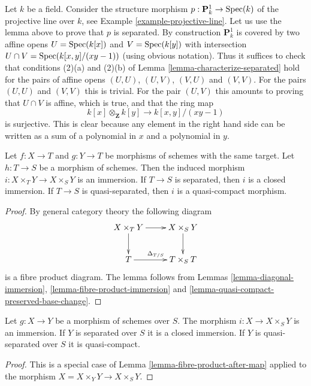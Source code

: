 \begin{example}
\label{example-projective-line-separated}
Let $k$ be a field. Consider the structure morphism
$p : \mathbf{P}^1_k \to \mathop{\mathrm{Spec}}(k)$ of the projective
line over $k$, see Example \ref{example-projective-line}.
Let us use the lemma above to prove that $p$
is separated. By construction $\mathbf{P}^1_k$ is covered by two
affine opens $U = \mathop{\mathrm{Spec}}(k[x])$ and $V = \mathop{\mathrm{Spec}}(k[y])$
with intersection $U \cap V = \mathop{\mathrm{Spec}}(k[x, y]/(xy - 1))$
(using obvious notation). Thus it suffices to check that
conditions (2)(a) and (2)(b) of Lemma \ref{lemma-characterize-separated}
hold for the pairs of affine opens $(U, U)$, $(U, V)$, $(V, U)$
and $(V, V)$. For the pairs $(U, U)$ and $(V, V)$ this is trivial.
For the pair $(U, V)$ this amounts to proving
that $U \cap V$ is affine, which is true, and that the ring map
$$
k[x] \otimes_{\mathbf{Z}} k[y] \longrightarrow k[x, y]/(xy - 1)
$$
is surjective. This is clear because any element in the
right hand side can be written as a sum of a polynomial
in $x$ and a polynomial in $y$.
\end{example}

\begin{lemma}
\label{lemma-fibre-product-after-map}
Let $f : X \to T$ and $g : Y \to T$ be morphisms of schemes
with the same target. Let $h : T \to S$ be a morphism of schemes.
Then the induced morphism $i : X \times_T Y \to X \times_S Y$ is
an immersion. If $T \to S$ is separated, then $i$ is a closed
immersion. If $T \to S$ is quasi-separated, then $i$ is a
quasi-compact morphism.
\end{lemma}

\begin{proof}
By general category theory the following diagram
$$
\xymatrix{
X \times_T Y \ar[r] \ar[d] & X \times_S Y \ar[d] \\
T \ar[r]^{\Delta_{T/S}} & T \times_S T
}
$$
is a fibre product diagram. The lemma follows
from Lemmas \ref{lemma-diagonal-immersion},
\ref{lemma-fibre-product-immersion} and
\ref{lemma-quasi-compact-preserved-base-change}.
\end{proof}

\begin{lemma}
\label{lemma-semi-diagonal}
Let $g : X \to Y$ be a morphism of schemes over $S$.
The morphism $i : X \to X \times_S Y$ is an immersion.
If $Y$ is separated over $S$ it is a closed immersion.
If $Y$ is quasi-separated over $S$ it is quasi-compact.
\end{lemma}

\begin{proof}
This is a special case of Lemma \ref{lemma-fibre-product-after-map}
applied to the morphism $X = X \times_Y Y \to X \times_S Y$.
\end{proof}

